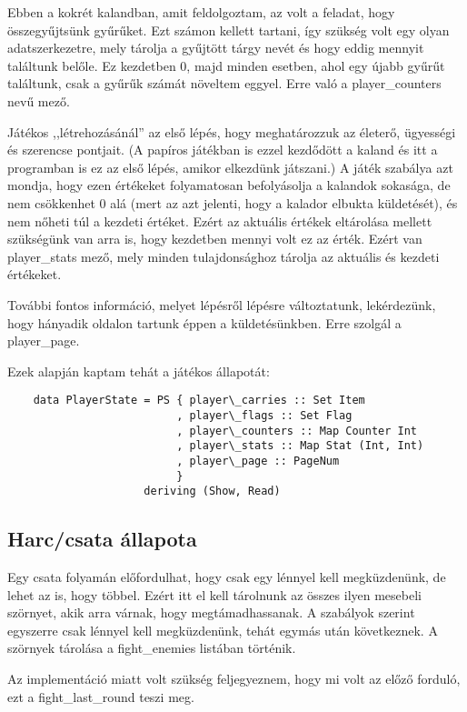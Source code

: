 \documentclass[12pt,a4paper,oneside]{report}
\begin{document}
    Ebben a kokrét kalandban, amit feldolgoztam, az volt a feladat,
    hogy összegyűjtsünk gyűrűket. Ezt számon kellett tartani, így
    szükség volt egy olyan adatszerkezetre, mely tárolja a gyűjtött
    tárgy nevét és hogy eddig mennyit találtunk belőle. Ez kezdetben
    0, majd minden esetben, ahol egy újabb gyűrűt találtunk, csak a
    gyűrűk számát növeltem eggyel. Erre való a player\_counters nevű mező.

    Játékos ,,létrehozásánál'' az első lépés, hogy meghatározzuk az
    életerő, ügyességi és szerencse pontjait. (A papíros játékban is
    ezzel kezdődött a kaland és itt a programban is ez az első lépés,
    amikor elkezdünk játszani.) A játék szabálya azt mondja, hogy ezen
    értékeket folyamatosan befolyásolja a kalandok sokasága, de nem
    csökkenhet 0 alá (mert az azt jelenti, hogy a kalador elbukta
    küldetését), és nem nőheti túl a kezdeti értéket. Ezért az aktuális
    értékek eltárolása mellett szükségünk van arra is, hogy kezdetben
    mennyi volt ez az érték. Ezért van player\_stats
    mező, mely minden tulajdonsághoz tárolja az aktuális és kezdeti értékeket.

    További fontos információ, melyet lépésről lépésre változtatunk,
    lekérdezünk, hogy hányadik oldalon tartunk éppen a
    küldetésünkben. Erre szolgál a player\_page.

    Ezek alapján kaptam tehát a játékos állapotát:
    \begin{verbatim}
    data PlayerState = PS { player\_carries :: Set Item
                          , player\_flags :: Set Flag
                          , player\_counters :: Map Counter Int
                          , player\_stats :: Map Stat (Int, Int)
                          , player\_page :: PageNum
                          }
                     deriving (Show, Read)
    \end{verbatim}

    \subsection{Harc/csata állapota}
    Egy csata folyamán előfordulhat, hogy csak egy lénnyel kell
    megküzdenünk, de lehet az is, hogy többel. Ezért itt el kell
    tárolnunk az összes ilyen mesebeli szörnyet, akik arra várnak,
    hogy megtámadhassanak. A szabályok szerint egyszerre csak lénnyel
    kell megküzdenünk, tehát egymás után következnek. A szörnyek
    tárolása a fight\_enemies listában történik.

    Az implementáció miatt volt szükség feljegyeznem,
    hogy mi volt az előző forduló, ezt a fight\_last\_round teszi
    meg.
\end{document}
